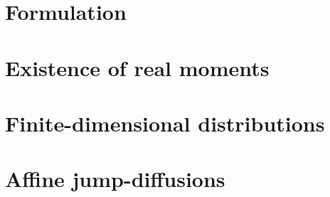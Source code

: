 \label{affine-processes:introduction}


\section{Formulation}
\label{affine-processes:formulation}


\section{Existence of real moments}
\label{affine-processes:real-moments}


\section{Finite-dimensional distributions}
\label{affine-processes:fdds}


\section{Affine jump-diffusions}
\label{affine-processes:jump-diffusions}


